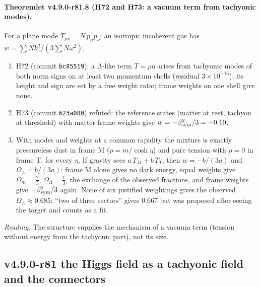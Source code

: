 \paragraph{Theoremlet v4.9.0-r81.8 (H72 and H73: a vacuum term from tachyonic modes).}
For a plane mode \(T_{\mu\nu}=N\,p_\mu p_\nu\); an isotropic incoherent gas has \(w=\sum N k^2/(3\sum N\omega^2)\).
\begin{enumerate}[leftmargin=2em]
\item[(a)] H72 (commit \texttt{bc85519}): a \(\Lambda\)-like term \(T=\rho\eta\) arises from tachyonic modes of both norm signs on at least two
momentum shells (residual \(3\times10^{-16}\)); its height and sign are set by a free weight ratio; frame weights on one shell give none.
\item[(b)] H73 (commit \texttt{623a080}) refuted: the reference states (matter at rest, tachyon at threshold) with matter-frame weights
give \(w=-\beta_{\mathrm{sym}}^2/3=-0.10\).
\item[(c)] With modes and weights at a common rapidity the mixture is exactly pressureless dust in frame M (\(\rho=m/\cosh\eta\)) and pure
tension with \(\rho=0\) in frame T, for every \(\eta\).  If gravity sees \(a\,T_M+b\,T_T\), then \(w=-b/(3a)\) and
\(\Omega_\Lambda=b/(3a)\): frame M alone gives no dark energy, equal weights give \(\Omega_m=\tfrac23\), \(\Omega_\Lambda=\tfrac13\), the
exchange of the observed fractions, and frame weights give \(-\beta_{\mathrm{sym}}^2/3\) again.  None of six justified weightings gives the observed
\(\Omega_\Lambda\approx0.685\); ``two of three sectors'' gives \(0.667\) but was proposed after seeing the target and counts as a fit.
\end{enumerate}
\emph{Reading.}  The structure supplies the mechanism of a vacuum term (tension without energy from the tachyonic part), not its size.

\subsection*{v4.9.0-r81 the Higgs field as a tachyonic field and the connectors}
\label{subsec:v490-r81-connectors}


